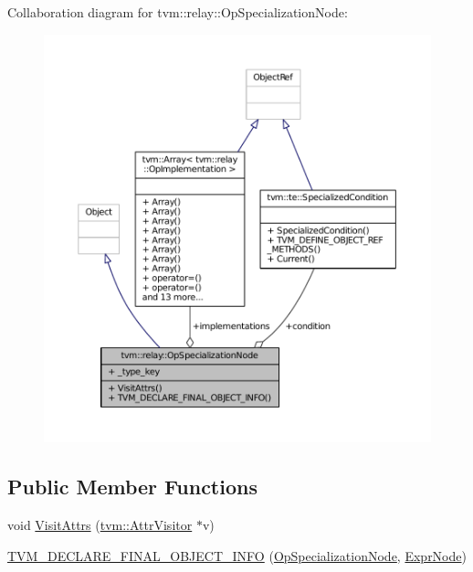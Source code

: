 Collaboration diagram for tvm\+:\+:relay\+:\+:Op\+Specialization\+Node\+:
\nopagebreak
\begin{figure}[H]
\begin{center}
\leavevmode
\includegraphics[width=350pt]{classtvm_1_1relay_1_1OpSpecializationNode__coll__graph}
\end{center}
\end{figure}
\subsection*{Public Member Functions}
\begin{DoxyCompactItemize}
\item 
void \hyperlink{classtvm_1_1relay_1_1OpSpecializationNode_a3590903d81f746830f5998505714823b}{Visit\+Attrs} (\hyperlink{classtvm_1_1AttrVisitor}{tvm\+::\+Attr\+Visitor} $\ast$v)
\item 
\hyperlink{classtvm_1_1relay_1_1OpSpecializationNode_a3b5193281eff0f2143a09e8b51406a55}{T\+V\+M\+\_\+\+D\+E\+C\+L\+A\+R\+E\+\_\+\+F\+I\+N\+A\+L\+\_\+\+O\+B\+J\+E\+C\+T\+\_\+\+I\+N\+FO} (\hyperlink{classtvm_1_1relay_1_1OpSpecializationNode}{Op\+Specialization\+Node}, \hyperlink{namespacetvm_1_1relay_a387f18e050d016c52ea6c4781e7cff6c}{Expr\+Node})
\end{DoxyCompactItemize}
